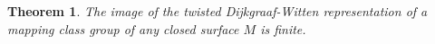\documentclass{amsart}
\newtheorem{thm}{Theorem}[section]
\DeclareMathOperator{\Homeo}{Homeo}
\begin{document}







\begin{thm}
The image of the twisted Dijkgraaf-Witten representation of a mapping class group of any closed surface $M$ is finite.
\end{thm}
\end{document}
